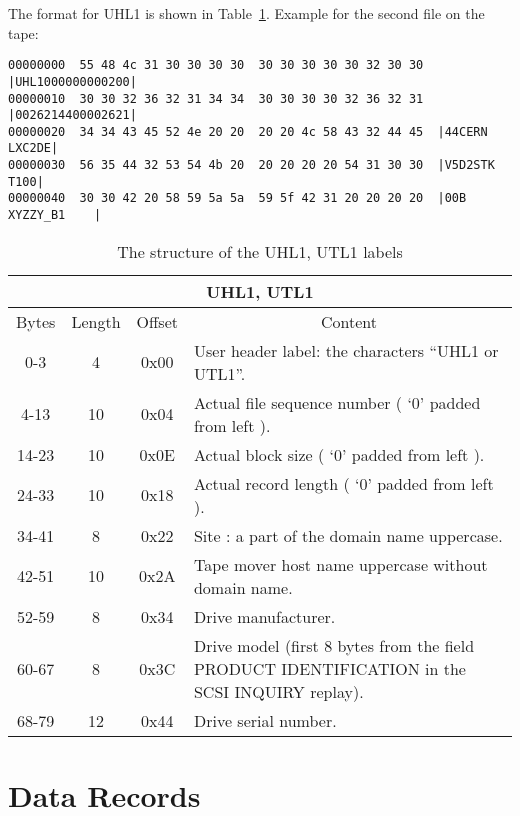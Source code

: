 The format for UHL1 is shown in Table~\ref{tab:uhl1_utl1_labels}. Example for the second file on the tape:
\begin{small}
\begin{verbatim}
00000000  55 48 4c 31 30 30 30 30  30 30 30 30 30 32 30 30  |UHL1000000000200|
00000010  30 30 32 36 32 31 34 34  30 30 30 30 32 36 32 31  |0026214400002621|
00000020  34 34 43 45 52 4e 20 20  20 20 4c 58 43 32 44 45  |44CERN    LXC2DE|
00000030  56 35 44 32 53 54 4b 20  20 20 20 20 54 31 30 30  |V5D2STK     T100|
00000040  30 30 42 20 58 59 5a 5a  59 5f 42 31 20 20 20 20  |00B XYZZY_B1    |
\end{verbatim}
\end{small}

\begin{table}[h!]
\caption{The structure of the UHL1, UTL1 labels}
\label{tab:uhl1_utl1_labels}
\begin{center}
\begin{tabularx}{\textwidth}{ |c|c|c|X| }
  \hline
  \multicolumn{4}{|c|}{UHL1, UTL1} \\
  \hline
  Bytes & Length & Offset & \multicolumn{1}{c|}{Content} \\
  \hline \hline
  0-3 & 4 & 0x00 & User header label: the characters ``UHL1 or UTL1''. \\
  \hline
  4-13 & 10 & 0x04 & Actual file sequence number ( `0' padded from left ). \\
  \hline
  14-23 & 10 & 0x0E & Actual block size ( `0' padded from left ). \\
  \hline
  24-33 & 10 & 0x18 & Actual record length ( `0' padded from left ). \\
  \hline
  34-41 & 8 & 0x22 & Site : a part of the domain name uppercase.\\
  \hline
  42-51 & 10 & 0x2A & Tape mover host name uppercase without domain name. \\
  \hline
  52-59 & 8 & 0x34 & Drive manufacturer. \\
  \hline
  60-67 & 8 & 0x3C & Drive model (first 8 bytes from the field PRODUCT IDENTIFICATION in the SCSI INQUIRY replay). \\
  \hline
  68-79 & 12 & 0x44 & Drive serial number. \\
  \hline
\end{tabularx}
\end{center}
\end{table}

\section{Data Records}

